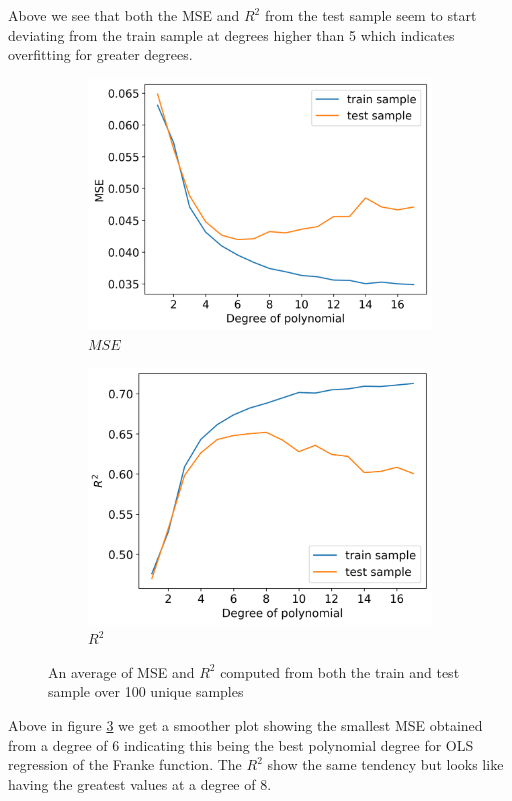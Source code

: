 \documentclass[12pt]{article}
\begin{document}
Above we see that both the MSE and $R^2$ from the test sample seem to start deviating from the train sample at degrees higher than 5 which indicates overfitting for greater degrees.
\begin{figure}[H]
  \begin{subfigure}{.5\textwidth}
    \centering
    \includegraphics[width=\textwidth]{../figures/MSE_train_test_resample.png}
    \caption{$MSE$}
    \label{fig:train_test_resample_mse}
  \end{subfigure}
  \begin{subfigure}{.5\textwidth}
    \centering
    \includegraphics[width=\textwidth]{../figures/R2_train_test_resample.png}
    \caption{$R^2$}
    \label{fig:train_test_resample_r2}
  \end{subfigure}
  \caption{An average of MSE and $R^2$ computed from both the train and test sample over 100 unique samples}
  \label{fig:train_test_resample}
\end{figure}
Above in figure \ref{fig:train_test_resample} we get a smoother plot showing the smallest MSE obtained from a degree of 6 indicating this being the best polynomial degree for OLS regression of the Franke function. The $R^2$ show the same tendency but looks like having the greatest values at a degree of 8.
\end{document}
